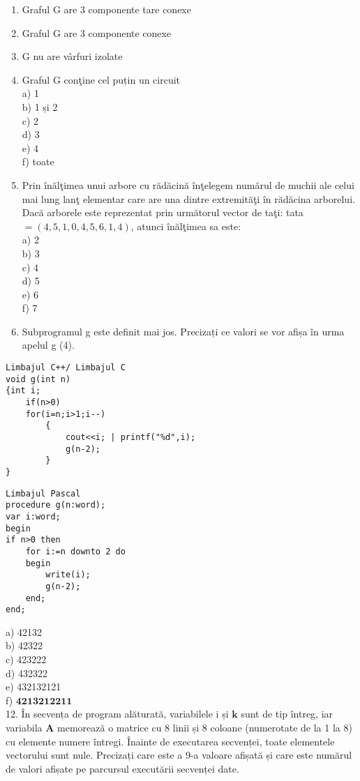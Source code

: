 \begin{enumerate}
  \item Graful G are 3 componente tare conexe
  \item Graful G are 3 componente conexe
  \item G nu are vârfuri izolate
  \item Graful G conţine cel puțin un circuit\\
a) 1\\
b) 1 și 2\\
c) 2\\
d) 3\\
e) 4\\
f) toate
  \item Prin înălţimea unui arbore cu rădăcină înţelegem numărul de muchii ale celui mai lung lanţ elementar care are una dintre extremităţi în rădăcina arborelui. Dacă arborele este reprezentat prin următorul vector de taţi: tata $=(4,5,1,0,4,5,6,1,4)$, atunci înălţimea sa este:\\
a) 2\\
b) 3\\
c) 4\\
d) 5\\
e) 6\\
f) 7
  \item Subprogramul g este definit mai jos. Precizați ce valori se vor afișa în urma apelul g (4).
\end{enumerate}

\begin{verbatim}
Limbajul C++/ Limbajul C
void g(int n)
{int i;
    if(n>0)
    for(i=n;i>1;i--)
        {
            cout<<i; | printf("%d",i);
            g(n-2);
        }
}
\end{verbatim}

\begin{verbatim}
Limbajul Pascal
procedure g(n:word);
var i:word;
begin
if n>0 then
    for i:=n downto 2 do
    begin
        write(i);
        g(n-2);
    end;
end;
\end{verbatim}

a) 42132\\
b) 42322\\
c) 423222\\
d) 432322\\
e) 432132121\\
f) $\mathbf{4 2 1 3 2 1 2 2 1 1}$\\
12. În secvența de program alăturată, variabilele i și $\mathbf{k}$ sunt de tip întreg, iar variabila $\mathbf{A}$ memorează o matrice cu 8 linii și 8 coloane (numerotate de la 1 la 8) cu elemente numere întregi. Înainte de executarea secvenței, toate elementele vectorului sunt nule. Precizați care este a 9-a valoare afișată și care este numărul de valori afișate pe parcursul executării secvenței date.

